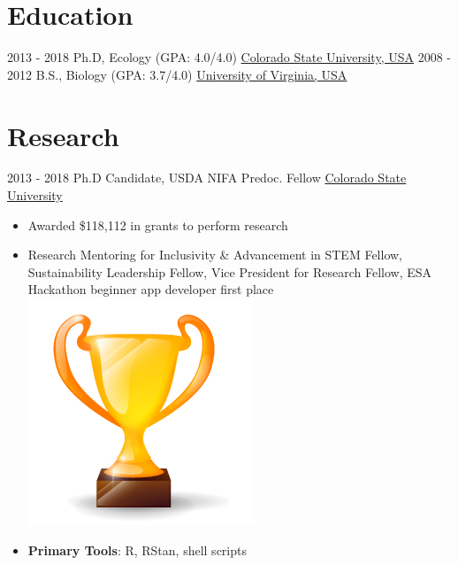 \documentclass[letterpaper]{twentysecondcv} %
\begin{document}
\makeprofile %

\section{Education}

\begin{twenty} %
	\twentyitem
    	{2013 - 2018}
        {}
        {Ph.D, Ecology \textnormal{(GPA: 4.0/4.0)}}
        {\href{http://www.colostate.edu/}{Colorado State University, USA}}
        {}
        {}
	\twentyitem
    	{2008 - 2012}
		{}
        {B.S., Biology \textnormal{(GPA: 3.7/4.0)}}
        {\href{http://www.virginia.edu/}{University of Virginia, USA}}
        {}
        {}
\end{twenty}

\section{Research}
\begin{twenty}
	\twentyitem
    	{2013 - 2018}
		{}
        {Ph.D Candidate, USDA NIFA Predoc. Fellow}
        {\href{http://www.colostate.edu/}{Colorado State University}}
        {}
        {
	\vspace{-2mm}
        {\begin{itemize}
        \item Awarded \$118,112 in grants to perform research
        \item Research Mentoring for Inclusivity \& Advancement in STEM Fellow, Sustainability Leadership Fellow, Vice President for Research Fellow, ESA Hackathon beginner app developer first place  {\includegraphics[scale=0.04]{img/trophy.png}}
        \item \textbf{Primary Tools}: R, RStan, shell scripts \vspace{2mm}
		\end{itemize}}
        }
\end{twenty}
\end{document}
